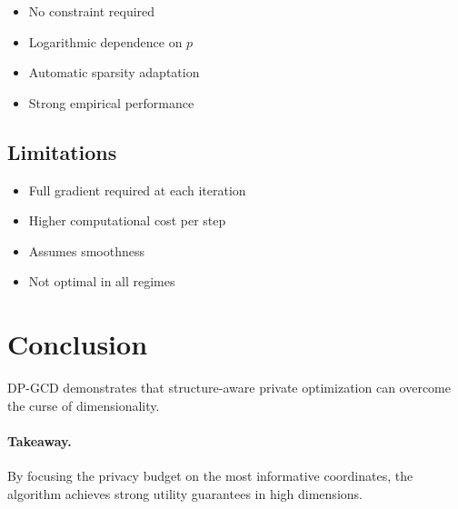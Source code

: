 \documentclass[11pt,a4paper]{article}
\begin{document}
\begin{itemize}
\item No constraint required
\item Logarithmic dependence on $p$
\item Automatic sparsity adaptation
\item Strong empirical performance
\end{itemize}

\subsection{Limitations}

\begin{itemize}
\item Full gradient required at each iteration
\item Higher computational cost per step
\item Assumes smoothness
\item Not optimal in all regimes
\end{itemize}

\section{Conclusion}

DP-GCD demonstrates that structure-aware private optimization can overcome the curse of dimensionality.

\paragraph{Takeaway.}
By focusing the privacy budget on the most informative coordinates, the algorithm achieves strong utility guarantees in high dimensions.
\end{document}

